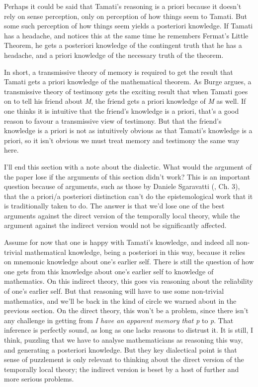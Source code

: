 \documentclass[
  10pt,
  letterpaper,
  DIV=11,
  numbers=noendperiod,
  twoside]{scrartcl}
\begin{document}
Perhaps it could be said that Tamati's reasoning is a priori because it
doesn't rely on sense perception, only on perception of how things seem
to Tamati. But some such perception of how things seem yields a
posteriori knowledge. If Tamati has a headache, and notices this at the
same time he remembers Fermat's Little Theorem, he gets a posteriori
knowledge of the contingent truth that he has a headache, and a priori
knowledge of the necessary truth of the theorem.

In short, a transmissive theory of memory is required to get the result
that Tamati gets a priori knowledge of the mathematical theorem. As
Burge argues, a transmissive theory of testimony gets the exciting
result that when Tamati goes on to tell his friend about \emph{M}, the
friend gets a priori knowledge of \emph{M} as well. If one thinks it is
intuitive that the friend's knowledge is a priori, that's a good reason
to favour a transmissive view of testimony. But that the friend's
knowledge is a priori is not as intuitively obvious as that Tamati's
knowledge is a priori, so it isn't obvious we must treat memory and
testimony the same way here.

I'll end this section with a note about the dialectic. What would the
argument of the paper lose if the arguments of this section didn't work?
This is an important question because of arguments, such as those by
Daniele Sgaravatti (, Ch. 3), that
the a priori/a posteriori distinction can't do the epistemological work
that it is traditionally taken to do. The answer is that we'd lose one
of the best arguments against the direct version of the temporally local
theory, while the argument against the indirect version would not be
significantly affected.

Assume for now that one is happy with Tamati's knowledge, and indeed all
non-trivial mathematical knowledge, being a posteriori in this way,
because it relies on mnemonic knowledge about one's earlier self. There
is still the question of how one gets from this knowledge about one's
earlier self to knowledge of mathematics. On this indirect theory, this
goes via reasoning about the reliability of one's earlier self. But that
reasoning will have to use some non-trivial mathematics, and we'll be
back in the kind of circle we warned about in the previous section. On
the direct theory, this won't be a problem, since there isn't any
challenge in getting from \emph{I have an apparent memory that p} to
\emph{p}. That inference is perfectly sound, as long as one lacks
reasons to distrust it. It is still, I think, puzzling that we have to
analyse mathematicians as reasoning this way, and generating a
posteriori knowledge. But they key dialectical point is that sense of
puzzlement is only relevant to thinking about the direct version of the
temporally local theory; the indirect version is beset by a host of
further and more serious problems.
\end{document}
